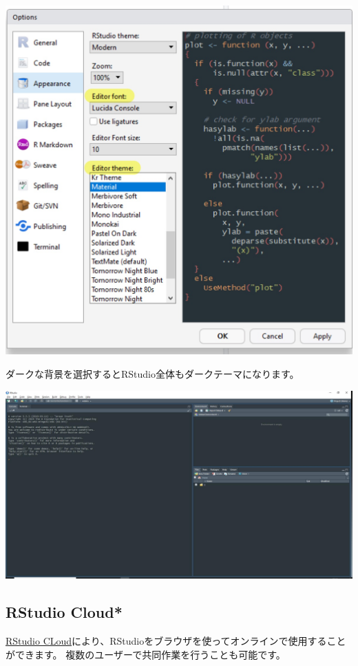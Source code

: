 \documentclass[]{bxjsreport}
\let\asdf\section
\renewcommand{\section}{\chapter}
\let\asdff\subsection
\renewcommand{\subsection}{\asdf}
\renewcommand{\subsubsection}{\asdff}
\begin{document}
\includegraphics{figures/Rstudio5.jpg}

ダークな背景を選択するとRStudio全体もダークテーマになります。

\includegraphics{figures/Rstudio6.jpg}

\hypertarget{rstudio-cloud}{%
\subsubsection{RStudio Cloud*}\label{rstudio-cloud}}

\href{https://rstudio.cloud/}{RStudio CLoud}により、RStudioをブラウザを使ってオンラインで使用することができます。
複数のユーザーで共同作業を行うことも可能です。
\end{document}
